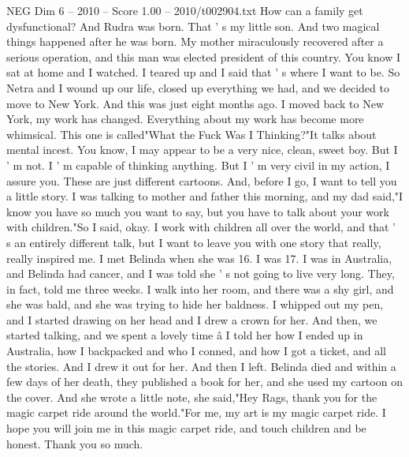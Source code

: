 \begin{textsample}{NEG Dim 6 – 2010 – Score 1.00 – 2010/t002904.txt}
How can a family get dysfunctional?
And Rudra was born.
That ' s my little son.
And two magical things happened after he was born.
My mother miraculously recovered after a serious operation, and this man was elected president of this country.
You know I sat at home and I watched.
I teared up and I said that ' s where I want to be.
So Netra and I wound up our life, closed up everything we had, and we decided to move to New York.
And this was just eight months ago.
I moved back to New York, my work has changed.
Everything about my work has become more whimsical.
This one is called"What the Fuck Was I Thinking?"It talks about mental incest.
You know, I may appear to be a very nice, clean, sweet boy.
But I ' m not.
I ' m capable of thinking anything.
But I ' m very civil in my action, I assure you.
These are just different cartoons.
And, before I go, I want to tell you a little story.
I was talking to mother and father this morning, and my dad said,"I know you have so much you want to say, but you have to talk about your work with children."So I said, okay.
I work with children all over the world, and that ' s an entirely different talk, but I want to leave you with one story that really, really inspired me.
I met Belinda when she was 16.
I was 17.
I was in Australia, and Belinda had cancer, and I was told she ' s not going to live very long.
They, in fact, told me three weeks.
I walk into her room, and there was a shy girl, and she was bald, and she was trying to hide her baldness.
I whipped out my pen, and I started drawing on her head and I drew a crown for her.
And then, we started talking, and we spent a lovely time â I told her how I ended up in Australia, how I backpacked and who I conned, and how I got a ticket, and all the stories.
And I drew it out for her.
And then I left.
Belinda died and within a few days of her death, they published a book for her, and she used my cartoon on the cover.
And she wrote a little note, she said,"Hey Rags, thank you for the magic carpet ride around the world."For me, my art is my magic carpet ride.
I hope you will join me in this magic carpet ride, and touch children and be honest.
Thank you so much.

\end{textsample}
